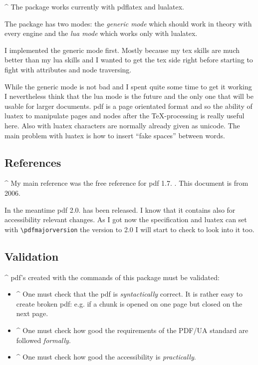 \documentclass[DIV=12,parskip=half-,bibliography=totoc]{scrartcl}
\begin{document}
\TagP^ The package works currently with pdflatex and lualatex.

\TagP The package has two modes: the \emph{generic mode} which should work in theory with every engine and the \emph{lua mode} which works only with lualatex.


\TagP I implemented the generic mode first. Mostly because my tex skills are much better than my lua skills and I wanted to get the tex side right before starting to fight with attributes and node traversing.

\TagP While the generic mode is not bad and I spent quite some time to get it working I nevertheless think that the lua mode is the future and the only one that will be usable for larger documents. pdf is a page orientated format and so the ability of luatex to manipulate pages and nodes after the \TeX-processing is really useful here. Also with luatex characters are normally already given as unicode. The main problem with luatex is how to insert \enquote{fake spaces} between words.%
\TagPend



\subsection{References}

\TagP^ My main reference was the free reference for pdf 1.7. \parencite{pdfreference}. This document is from 2006.

\TagP In the meantime pdf 2.0. has been released. I know that it contains also for accessibility relevant changes. As I got now the specification and luatex can set with \verb+\pdfmajorversion+ the version to 2.0 I will start to check to look into it too.%
\TagPend

\subsection{Validation}

\TagP^ pdf's created with the commands of this package must be validated:\TagPend


\begin{itemize}
\item
\TagP^ One must check that the pdf is \emph{syntactically} correct. It is rather easy to create broken pdf: e.g. if a chunk is opened on one page but closed on the next page.
    \Pmeti
\item
\TagP^ One must check how good the requirements of the PDF/UA standard are followed \emph{formally}.
    \Pmeti
\item
\TagP^ One must check how good the accessibility is \emph{practically}.\Pmeti
\end{itemize}
\end{document}
